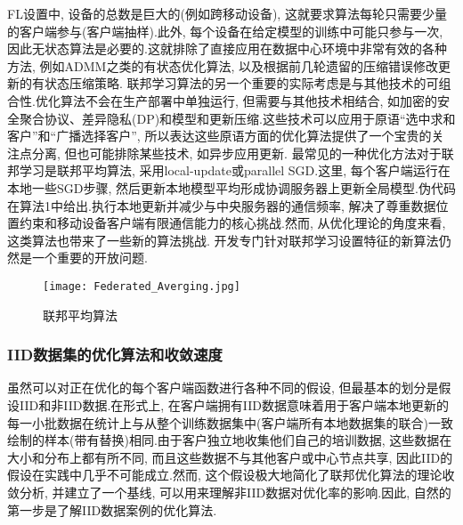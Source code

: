 FL设置中, 设备的总数是巨大的(例如跨移动设备), 这就要求算法每轮只需要少量的客户端参与(客户端抽样).此外, 每个设备在给定模型的训练中可能只参与一次, 因此无状态算法是必要的.这就排除了直接应用在数据中心环境中非常有效的各种方法, 例如ADMM之类的有状态优化算法, 以及根据前几轮遗留的压缩错误修改更新的有状态压缩策略.
联邦学习算法的另一个重要的实际考虑是与其他技术的可组合性.优化算法不会在生产部署中单独运行, 但需要与其他技术相结合, 如加密的安全聚合协议、差异隐私(DP)和模型和更新压缩.这些技术可以应用于原语“选中求和客户”和“广播选择客户”, 所以表达这些原语方面的优化算法提供了一个宝贵的关注点分离, 但也可能排除某些技术, 如异步应用更新.
最常见的一种优化方法对于联邦学习是联邦平均算法\citep{mcmahan2016communication}, 采用local-update或parallel SGD.这里, 每个客户端运行在本地一些SGD步骤, 然后更新本地模型平均形成协调服务器上更新全局模型.伪代码在算法1中给出.执行本地更新并减少与中央服务器的通信频率, 解决了尊重数据位置约束和移动设备客户端有限通信能力的核心挑战.然而, 从优化理论的角度来看, 这类算法也带来了一些新的算法挑战. 开发专门针对联邦学习设置特征的新算法仍然是一个重要的开放问题.
\begin{figure*}[ht]
    \setlength{\abovecaptionskip}{0.1cm}
    \centering
    \texttt{[image: Federated\_Averging.jpg]}
    \caption{联邦平均算法}
\end{figure*}

\subsubsection{ IID数据集的优化算法和收敛速度}

虽然可以对正在优化的每个客户端函数进行各种不同的假设, 但最基本的划分是假设IID和非IID数据.在形式上, 在客户端拥有IID数据意味着用于客户端本地更新的每一小批数据在统计上与从整个训练数据集中(客户端所有本地数据集的联合)一致绘制的样本(带有替换)相同.由于客户独立地收集他们自己的培训数据, 这些数据在大小和分布上都有所不同, 而且这些数据不与其他客户或中心节点共享, 因此IID的假设在实践中几乎不可能成立.然而, 这个假设极大地简化了联邦优化算法的理论收敛分析, 并建立了一个基线, 可以用来理解非IID数据对优化率的影响.因此, 自然的第一步是了解IID数据案例的优化算法.


